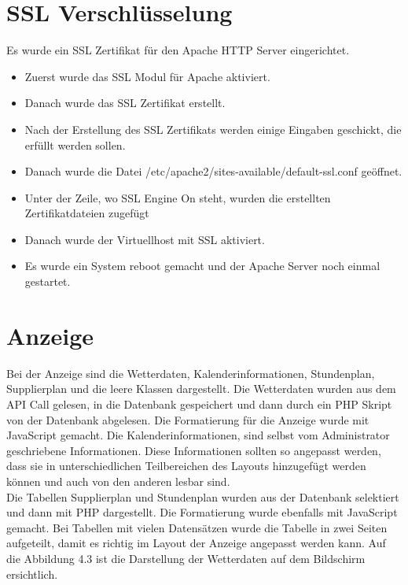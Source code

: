 \section{SSL Verschlüsselung}
Es wurde ein SSL Zertifikat für den Apache HTTP Server eingerichtet.
\begin{itemize}
	\item Zuerst wurde das SSL Modul für Apache aktiviert.
\end{itemize}
\begin{itemize}
	\item Danach wurde das SSL Zertifikat erstellt. 
\end{itemize}
\begin{itemize}
	\item Nach der Erstellung des SSL Zertifikats werden einige Eingaben geschickt, die erfüllt werden sollen. 
\end{itemize}
\begin{itemize}
	\item Danach wurde die Datei /etc/apache2/sites-available/default-ssl.conf geöffnet.
\end{itemize}
\begin{itemize}
	\item Unter der Zeile, wo SSL Engine On steht, wurden die erstellten Zertifikatdateien zugefügt
\end{itemize}
\begin{itemize}
	\item Danach wurde der Virtuellhost mit SSL aktiviert. 
\end{itemize}
\begin{itemize}
	\item Es wurde ein System reboot gemacht und der Apache Server noch einmal gestartet. \cite{50_SSS}
\end{itemize}
\section{Anzeige}
Bei der Anzeige sind die Wetterdaten, Kalenderinformationen, Stundenplan, Supplierplan und die leere Klassen dargestellt. Die Wetterdaten wurden aus dem API Call gelesen, in die Datenbank gespeichert und dann durch ein PHP Skript von der Datenbank abgelesen. Die Formatierung für die Anzeige wurde mit JavaScript gemacht. Die Kalenderinformationen, sind selbst vom Administrator geschriebene Informationen. Diese Informationen sollten so angepasst werden, dass sie in unterschiedlichen Teilbereichen des Layouts hinzugefügt werden können und auch von den anderen lesbar sind. \\
Die Tabellen Supplierplan und Stundenplan wurden aus der Datenbank selektiert und dann mit PHP dargestellt. Die Formatierung wurde ebenfalls mit JavaScript gemacht. Bei Tabellen mit vielen Datensätzen wurde die Tabelle in zwei Seiten aufgeteilt, damit es richtig im Layout der Anzeige angepasst werden kann. Auf die Abbildung 4.3 ist die Darstellung der Wetterdaten auf dem Bildschirm ersichtlich. \\
